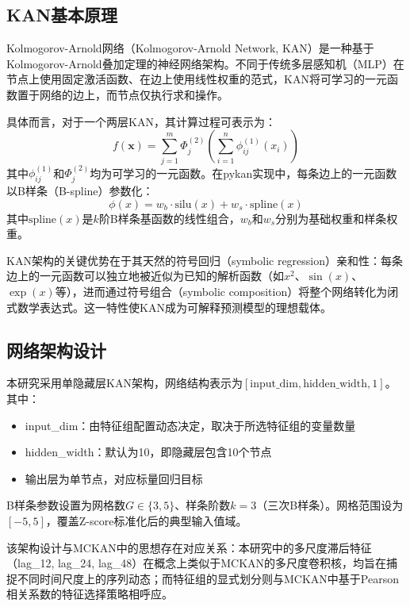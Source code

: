 \subsection{KAN基本原理}

Kolmogorov-Arnold网络（Kolmogorov-Arnold Network, KAN）\cite{kolmogorov1957representation}是一种基于Kolmogorov-Arnold叠加定理\cite{arnold1957functions}的神经网络架构。不同于传统多层感知机（MLP）在节点上使用固定激活函数、在边上使用线性权重的范式，KAN将可学习的一元函数置于网络的边上，而节点仅执行求和操作。

具体而言，对于一个两层KAN，其计算过程可表示为：
\begin{equation}
f(\mathbf{x}) = \sum_{j=1}^{m} \Phi_{j}^{(2)}\left(\sum_{i=1}^{n} \phi_{ij}^{(1)}(x_i)\right)
\end{equation}
其中$\phi_{ij}^{(1)}$和$\Phi_{j}^{(2)}$均为可学习的一元函数。在pykan实现中\cite{liu2025kan}，每条边上的一元函数以B样条（B-spline）参数化：
\begin{equation}
\phi(x) = w_b \cdot \text{silu}(x) + w_s \cdot \text{spline}(x)
\end{equation}
其中$\text{spline}(x)$是$k$阶B样条基函数的线性组合，$w_b$和$w_s$分别为基础权重和样条权重。

KAN架构的关键优势在于其天然的符号回归（symbolic regression）亲和性：每条边上的一元函数可以独立地被近似为已知的解析函数（如$x^2$、$\sin(x)$、$\exp(x)$等），进而通过符号组合（symbolic composition）将整个网络转化为闭式数学表达式。这一特性使KAN成为可解释预测模型的理想载体。

\subsection{网络架构设计}

本研究采用单隐藏层KAN架构，网络结构表示为$[\text{input\_dim}, \text{hidden\_width}, 1]$。其中：

\begin{itemize}
  \item input\_dim：由特征组配置动态决定，取决于所选特征组的变量数量
  \item hidden\_width：默认为10，即隐藏层包含10个节点
  \item 输出层为单节点，对应标量回归目标
\end{itemize}

B样条参数设置为网格数$G \in \{3, 5\}$、样条阶数$k=3$（三次B样条）。网格范围设为$[-5, 5]$，覆盖Z-score标准化后的典型输入值域。

该架构设计与MCKAN\cite{chen2025mckan}中的思想存在对应关系：本研究中的多尺度滞后特征（lag\_12, lag\_24, lag\_48）在概念上类似于MCKAN的多尺度卷积核，均旨在捕捉不同时间尺度上的序列动态；而特征组的显式划分则与MCKAN中基于Pearson相关系数的特征选择策略相呼应。

